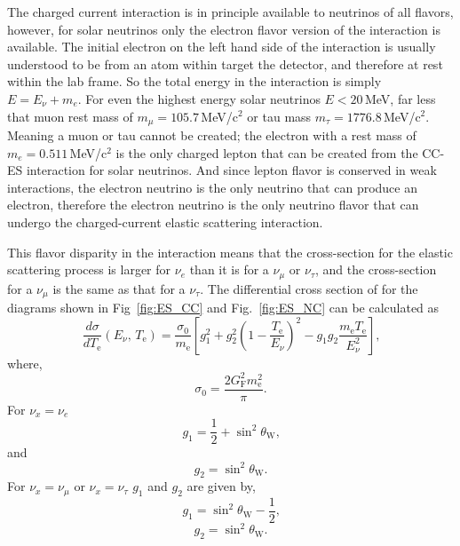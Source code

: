 The charged current interaction is in principle available to neutrinos of all
flavors, however, for solar neutrinos only the electron flavor version of the
interaction is available.
The initial electron on the left hand side of the interaction is usually understood to
be from an atom within target the detector, and therefore at rest within
the lab frame.
So the total energy in the interaction is simply $E = E_{\nu} + m_{e}$.
For even the highest energy solar neutrinos $E<20$\,MeV, far less that muon
rest mass of $m_{\mu}=105.7$\,MeV/$\text{c}^{2}$ or tau mass $m_\tau = 1776.8$\,MeV/$\text{c}^{2}$.
Meaning a muon or tau cannot be created; the electron with a rest mass
of $m_{e}=0.511$\,MeV/$\text{c}^{2}$ is the only charged lepton that can
be created from the CC-ES interaction for solar neutrinos.
And since lepton flavor is conserved in weak interactions, the electron neutrino
is the only neutrino that can produce an electron, therefore the electron
neutrino is the only neutrino flavor that can undergo the charged-current
elastic scattering interaction.


This flavor disparity in the interaction means that the cross-section for the
elastic scattering process is larger for $\nu_{e}$ than it is for a $\nu_\mu$
or $\nu_\tau$, and the cross-section for a $\nu_\mu$ is the same as that for a
$\nu_\tau$.
The differential cross section of for the diagrams shown in Fig~\ref{fig:ES_CC} and
Fig.~\ref{fig:ES_NC} can be calculated as
\begin{equation}
    \frac{d\sigma}{dT_{\mathrm{e}}}\left(E_{\nu}\text{, }T_{\mathrm{e}}\right)=
    \frac{\sigma_{0}}{m_{\mathrm{e}}}\left[g_{1}^{2} + g_{2}^{2}\left(1 - \frac{T_{\mathrm{e}}}{E_{\nu}}\right)^{2} -g_{1}g_{2}\frac{m_{\mathrm{e}}T_{\mathrm{e}}}{E_{\nu}^{2}}\right]\text{,}
\end{equation}
where,
\begin{equation}
    \sigma_{0} = \frac{2G^{2}_{\mathrm{F}}m_{\mathrm{e}}^{2}}{\pi}\text{.}
\end{equation}
For $\nu_{x} = \nu_{e}$
\begin{equation}
    g_{1} = \frac{1}{2} + \sin^{2}\theta_{\mathrm{W}}\text{,}
\end{equation}
and
\begin{equation}
    g_{2} = \sin^{2}\theta_{\mathrm{W}}\text{.}
\end{equation}
For $\nu_{x} = \nu_{\mu}$ or $\nu_{x} = \nu_{\tau}$ $g_{1}$ and $g_{2}$ are
given by,
\begin{equation}
    g_{1} = \sin^{2}\theta_{\mathrm{W}} - \frac{1}{2}\text{,}
\end{equation}
\begin{equation}
    g_{2} = \sin^{2}\theta_{\mathrm{W}}\text{.}
\end{equation}

